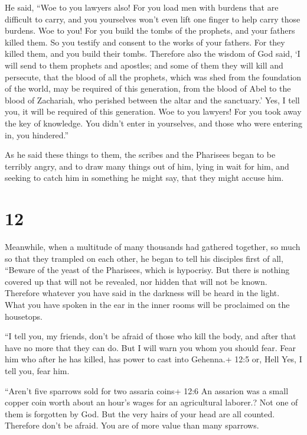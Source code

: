  He said, ``Woe to you lawyers also! For you load men with
burdens that are difficult to carry, and you yourselves won't even lift
one finger to help carry those burdens.  Woe to you! For
you build the tombs of the prophets, and your fathers killed them.
 So you testify and consent to the works of your fathers.
For they killed them, and you build their tombs.  Therefore
also the wisdom of God said, `I will send to them prophets and apostles;
and some of them they will kill and persecute,  that the
blood of all the prophets, which was shed from the foundation of the
world, may be required of this generation,  from the blood
of Abel to the blood of Zachariah, who perished between the altar and
the sanctuary.' Yes, I tell you, it will be required of this generation.
 Woe to you lawyers! For you took away the key of
knowledge. You didn't enter in yourselves, and those who were entering
in, you hindered.''

 As he said these things to them, the scribes and the
Pharisees began to be terribly angry, and to draw many things out of
him,  lying in wait for him, and seeking to catch him in
something he might say, that they might accuse him.

\hypertarget{section-11}{%
\section{12}\label{section-11}}

 Meanwhile, when a multitude of many thousands had gathered
together, so much so that they trampled on each other, he began to tell
his disciples first of all, ``Beware of the yeast of the Pharisees,
which is hypocrisy.  But there is nothing covered up that
will not be revealed, nor hidden that will not be known. 
Therefore whatever you have said in the darkness will be heard in the
light. What you have spoken in the ear in the inner rooms will be
proclaimed on the housetops.

 ``I tell you, my friends, don't be afraid of those who kill
the body, and after that have no more that they can do.  But
I will warn you whom you should fear. Fear him who after he has killed,
has power to cast into Gehenna.+ 12:5 or, Hell Yes, I tell you, fear
him.

 ``Aren't five sparrows sold for two assaria coins+ 12:6 An
assarion was a small copper coin worth about an hour's wages for an
agricultural laborer.? Not one of them is forgotten by God. 
But the very hairs of your head are all counted. Therefore don't be
afraid. You are of more value than many sparrows.

